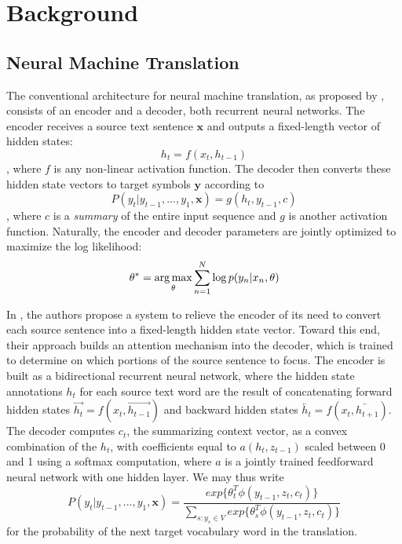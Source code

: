 \section{Background}
\label{sec:background}

\subsection{Neural Machine Translation}
The conventional architecture for neural machine translation, as proposed by ,
consists of an encoder and a decoder, both recurrent neural networks. The encoder receives
a source text sentence $\mathbf{x}$ and outputs a fixed-length vector of hidden states:
\begin{equation}
h_{t} = f(x_{t}, h_{t-1})
\end{equation},
where $f$ is any non-linear activation function. The decoder then converts these hidden state vectors to
target symbols $\mathbf{y}$ according to
\begin{equation}
P(y_{t} | y_{t-1}, ..., y_{1}, \mathbf{x}) = g(h_{t}, y_{t-1}, c)
\end{equation},
where $c$ is a \emph{summary} of the entire input sequence and $g$ is another activation function.
Naturally, the encoder and decoder parameters are jointly optimized to maximize the log likelihood:
\begin{equation}
\theta^{*} = \operatorname*{arg\,max}_{\theta} \sum_{n=1}^{N}\log p(y_{n} | x_{n}, \theta)
\end{equation}

In , the authors propose a system to relieve the encoder of its need
to convert each source sentence into a fixed-length hidden state vector. Toward this end, their approach builds an attention mechanism
into the decoder, which is trained to determine on which portions of the source sentence to focus. The encoder
is built as a bidirectional recurrent neural network, where the hidden state annotations $h_{t}$ for each source text word
are the result of concatenating forward hidden states $\overrightarrow{h_{t}} = f(x_{t}, \overrightarrow{h_{t-1}})$ and backward hidden states
$\overleftarrow{h_{t}} = f(x_{t}, \overleftarrow{h_{t+1}})$. The decoder computes $c_{t}$, the summarizing context vector,
as a convex combination of the $h_{t}$, with coefficients equal to $a(h_{t}, z_{t-1})$ scaled between 0 and 1 using a softmax computation, where $a$ is a
jointly trained feedforward neural network with one hidden layer. We may thus write
\begin{equation}
P(y_{t} | y_{t-1}, ..., y_{1}, \mathbf{x}) = \dfrac{exp\{\theta_{t}^{T} \phi(y_{t-1}, z_{t}, c_{t})\}}{\displaystyle\sum_{s:y_{s} \in V} exp\{\theta_{s}^{T} \phi(y_{t-1}, z_{t}, c_{t})\}}
\end{equation}
for the probability of the next target vocabulary word in the translation.\\

